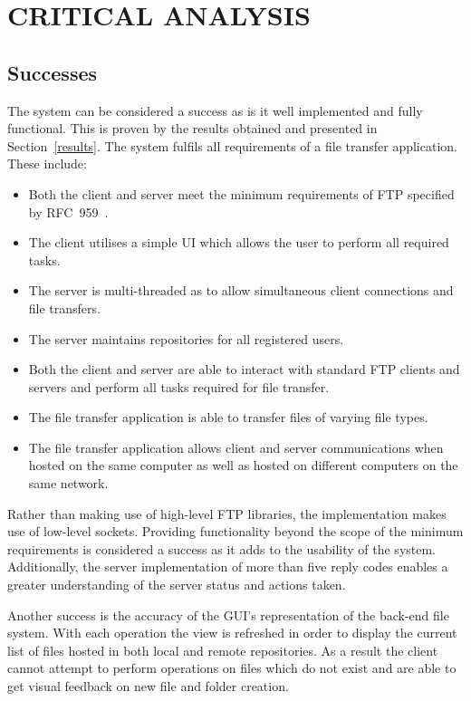 \documentclass[10pt,twocolumn]{witseiepaper}
\begin{document}
\section{CRITICAL ANALYSIS}

\subsection{Successes}

The system can be considered a success as is it well implemented and fully functional. This is proven by the results obtained and presented in Section~\ref{results}. The system fulfils all requirements of a file transfer application. These include:

\vspace*{-2mm}

\begin{itemize}
	\item Both the client and server meet the minimum requirements of FTP specified by RFC~959~\cite{rfc959}.
	\item The client utilises a simple UI which allows the user to perform all required tasks.
	\item The server is multi-threaded as to allow simultaneous client connections and file transfers.
	\item The server maintains repositories for all registered users.
	\item Both the client and server are able to interact with standard FTP clients and servers and perform all tasks required for file transfer.
	\item The file transfer application is able to transfer files of varying file types.
	\item The file transfer application allows client and server communications when hosted on the same computer as well as hosted on different computers on the same network.
\end{itemize} 
\vspace*{-2mm}

Rather than making use of high-level FTP libraries, the implementation makes use of low-level sockets. Providing functionality beyond the scope of the minimum requirements is considered a success as it adds to the usability of the system. Additionally, the server implementation of more than five reply codes enables a greater understanding of the server status and actions taken.

Another success is the accuracy of the GUI's representation of the back-end file system. With each operation the view is refreshed in order to display the current list of files hosted in both local and remote repositories. As a result the client cannot attempt to perform operations on files which do not exist and are able to get visual feedback on new file and folder creation.
\end{document}
